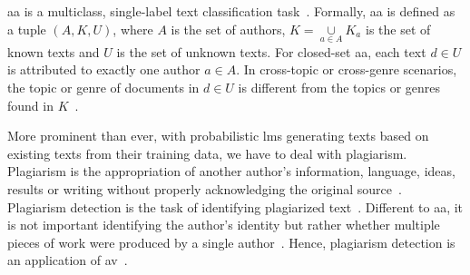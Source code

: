 \ac{aa} is a multiclass, single-label text classification task~\citep{stamatatos_survey_2009,koppel_authorship_2004,elmanarelbouanani_authorship_2014}.
Formally, \ac{aa} is defined as a tuple $(A,K,U)$, where $A$ is the set of authors, $K=\underset{a\in A}{\cup}K_a$ is the set of known texts and $U$ is the set of unknown texts.
For closed-set \ac{aa}, each text $d \in U$ is attributed to exactly one author $a \in A$.
In cross-topic or cross-genre scenarios, the topic or genre of documents in $d \in U$ is different from the topics or genres found in $K$~\citep{barlas_cross_domain_2020}. 




More prominent than ever, with probabilistic \acp{lm} generating texts based on existing texts from their training data, we have to deal with plagiarism.
Plagiarism is the appropriation of another author's information, language, ideas, results or writing without properly acknowledging the original source~\citep{stein_intrinsic_2011,gohsen_task_oriented_2024}.
Plagiarism detection is the task of identifying plagiarized text~\citep{stein_intrinsic_2011}.
Different to \ac{aa}, it is not important identifying the author's identity but rather whether multiple pieces of work were produced by a single author~\citep{elmanarelbouanani_authorship_2014}.
Hence, plagiarism detection is an application of \ac{av}~\citep{rivera_soto_learning_2021}.

